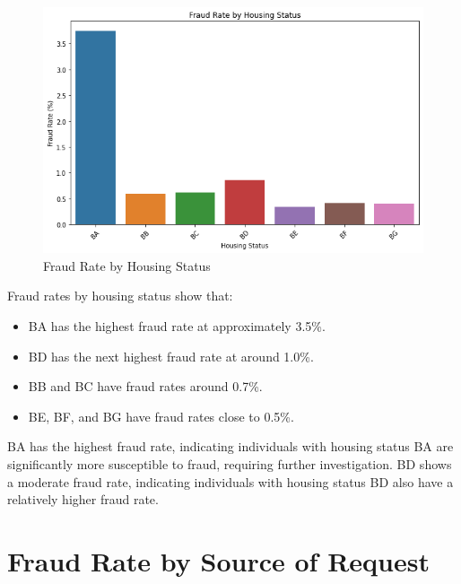 \documentclass[12pt,a4paper]{report}
\begin{document}
\begin{figure}[h]
    \centering
    \includegraphics[width=\textwidth]{housing_status_fraud_rate.png}
    \caption{Fraud Rate by Housing Status}
    \label{fig:housing_status_fraud_rate}
\end{figure}

Fraud rates by housing status show that:

\begin{itemize}
    \item BA has the highest fraud rate at approximately 3.5\%.
    \item BD has the next highest fraud rate at around 1.0\%.
    \item BB and BC have fraud rates around 0.7\%.
    \item BE, BF, and BG have fraud rates close to 0.5\%.
\end{itemize}

BA has the highest fraud rate, indicating individuals with housing status BA are significantly more susceptible to fraud, requiring further investigation. BD shows a moderate fraud rate, indicating individuals with housing status BD also have a relatively higher fraud rate.\\

\section{Fraud Rate by Source of Request}
\end{document}
